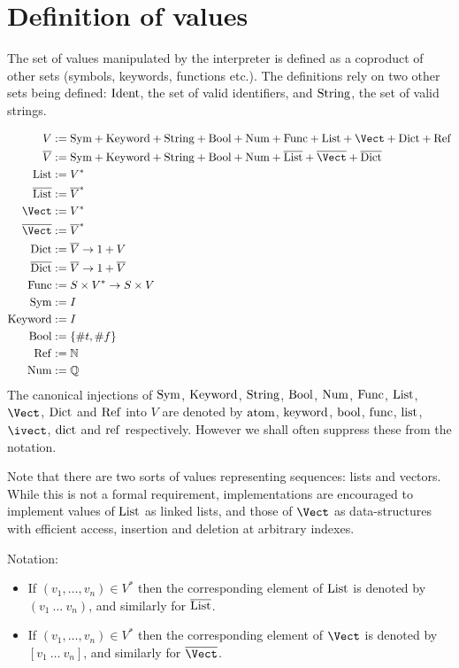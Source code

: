 \section{Definition of \rad{} values}
\label{value-definition}

The set of values manipulated by the \rad{} interpreter is defined as a coproduct
of other sets (symbols, keywords, functions etc.). The definitions rely on two
other sets being defined: $\mathrm{Ident}$, the set of valid identifiers, and $\mathrm{String}$,
the set of valid strings.

\begin{align*}
  V &:= \Sym + \Keyword + \String + \Bool + \Num + \Func + \List + \Vect + \Dict + \Ref\\
  \overline{V} &:= \Sym + \Keyword + \String + \Bool + \Num + \overline{\List} + \overline{\Vect} + \overline{\Dict}\\
  \List &:= V^*\\
  \overline{\List} &:= \overline{V}^*\\
  \Vect &:= V^*\\
  \overline{\Vect} &:= \overline{V}^*\\
  \Dict &:= \overline{V} \to 1 + V\\
  \overline{\Dict} &:= \overline{V} \to 1 + \overline{V}\\
  \Func &:= S \times V^* \to S \times V\\
  \Sym &:= I\\
  \Keyword &:= I\\
  \Bool &:= \{\#t, \#f\}\\
  \Ref &:= \mathbb{N}\\
  \Num &:= \mathbb{Q}
\end{align*}
The canonical injections of $\mathrm{Sym}$, $\mathrm{Keyword}$, $\mathrm{String}$, $\mathrm{Bool}$, $\mathrm{Num}$,
$\mathrm{Func}$, $\mathrm{List}$, $\Vect$, $\mathrm{Dict}$ and $\mathrm{Ref}$ into $V$ are denoted by $\mathrm{atom}$,
$\mathrm{keyword}$, $\mathrm{bool}$, $\mathrm{func}$, $\mathrm{list}$, $\ivect$, $\mathrm{dict}$ and $\mathrm{ref}$ respectively.
However we shall often suppress these from the notation.

Note that there are two sorts of values representing sequences: lists and
vectors. While this is not a formal requirement, implementations are encouraged
to implement values of $\mathrm{List}$ as linked lists, and those of $\Vect$ as
data-structures with efficient access, insertion and deletion at arbitrary
indexes.

Notation:
\begin{itemize}
  \item If $(v_1, \ldots, v_n) \in V^*$ then the corresponding element of
    $\mathrm{List}$ is denoted by $(v_1 \ \ldots \ v_n)$, and similarly for
    $\overline{\mathrm{List}}$.
  \item If $(v_1, \ldots, v_n) \in V^*$ then the corresponding element of
    $\Vect$ is denoted by $[v_1 \ \ldots \ v_n]$, and similarly for $\overline{\Vect}$.
\end{itemize}
